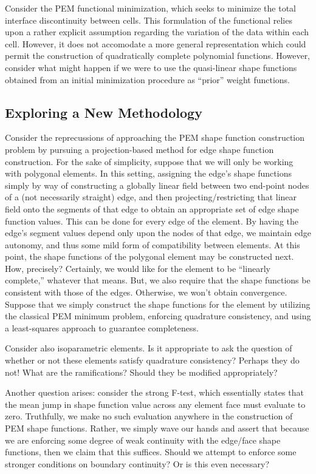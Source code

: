 \documentclass[11pt]{article} %
\begin{document}
Consider the PEM functional minimization, which seeks to minimize the total interface discontinuity between cells. This formulation of the functional relies upon a rather explicit assumption regarding the variation of the data within each cell. However, it does not accomodate a more general representation which could permit the construction of quadratically complete polynomial functions. However, consider what might happen if we were to use the quasi-linear shape functions obtained from an initial minimization procedure as ``prior'' weight functions. 

\subsection{Exploring a New Methodology}

Consider the reprecussions of approaching the PEM shape function construction problem by pursuing a projection-based method for edge shape function construction. For the sake of simplicity, suppose that we will only be working with polygonal elements. In this setting, assigning the edge's shape functions simply by way of constructing a globally linear field between two end-point nodes of a (not necessarily straight) edge, and then projecting/restricting that linear field onto the segments of that edge to obtain an appropriate set of edge shape function values. This can be done for every edge of the element. By having the edge's segment values depend only upon the nodes of that edge, we maintain edge autonomy, and thus some mild form of compatibility between elements. At this point, the shape functions of the polygonal element may be constructed next. How, precisely? Certainly, we would like for the element to be ``linearly complete,'' whatever that means. But, we also require that the shape functions be consistent with those of the edges. Otherwise, we won't obtain convergence. Suppose that we simply construct the shape functions for the element by utilizing the classical PEM minimum problem, enforcing quadrature consistency, and using a least-squares approach to guarantee completeness.

Consider also isoparametric elements. Is it appropriate to ask the question of whether or not these elements satisfy quadrature consistency? Perhaps they do not! What are the ramifications? Should they be modified appropriately?

Another question arises: consider the strong F-test, which essentially states that the mean jump in shape function value across any element face must evaluate to zero. Truthfully, we make no such evaluation anywhere in the construction of PEM shape functions. Rather, we simply wave our hands and assert that because we are enforcing some degree of weak continuity with the edge/face shape functions, then we claim that this suffices. Should we attempt to enforce some stronger conditions on boundary continuity? Or is this even necessary?
\end{document}
